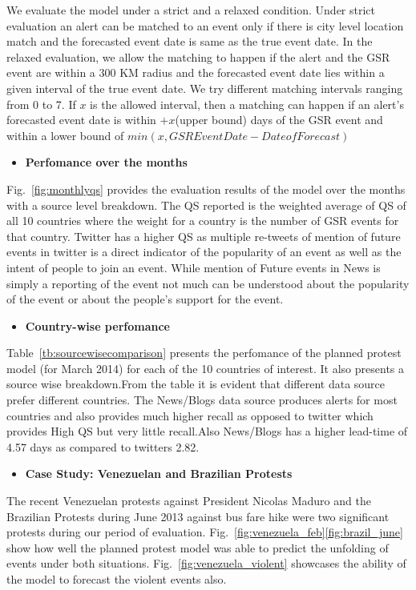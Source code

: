 We evaluate the model under a strict and a relaxed condition. Under strict evaluation an alert can be matched to an event only if there is city level location match and the forecasted event date is same as the true event date. In the relaxed evaluation, we allow the matching to happen if the alert and the GSR event are within a 300 KM radius and the forecasted event date lies within a given interval of the true event date. We try different matching intervals ranging from 0 to 7. If $x$ is the allowed interval, then a matching can happen if an alert's forecasted event date is within $+x$(upper bound) days of the GSR event and within a lower bound of $min(x,GSR Event Date - Date of Forecast)$ 
\begin{itemize}
    \item {\bf Perfomance over the months}
\end{itemize}
    Fig.~\ref{fig:monthlyqs} provides the evaluation results of the model over the months with a source level breakdown. The QS reported is the weighted average of QS of all 10 countries where the weight for a country is the number of GSR events for that country.
    Twitter has a higher QS as multiple re-tweets of mention of future events in twitter is a direct indicator of the popularity of an event as well as the intent of people to join an event. While mention of Future events in News is simply a reporting of the event not much can be understood about the popularity of the event or about the people's support for the event. 
\begin{itemize}
    \item {\bf Country-wise perfomance}
\end{itemize}
    Table~\ref{tb:sourcewisecomparison} presents the perfomance of the planned protest model (for March 2014) for each of the 10 countries of interest. It also presents a source wise breakdown.From the table it is evident that different data source prefer different countries. The News/Blogs data source produces alerts for most countries and also provides much higher recall as opposed to twitter which provides High QS but very little recall.Also News/Blogs has a higher lead-time of 4.57 days as compared to twitters 2.82.

\begin{itemize}
    \item {\bf Case Study: Venezuelan and Brazilian Protests}
\end{itemize}
The recent Venezuelan protests against President Nicolas Maduro and the Brazilian Protests during June 2013 against bus fare hike were two significant protests during our period of evaluation. Fig.~\ref{fig:venezuela_feb}\ref{fig:brazil_june} show how well the planned protest model was able to predict the unfolding of events under both situations. Fig.~\ref{fig:venezuela_violent} showcases the ability of the model to forecast the violent events also.

